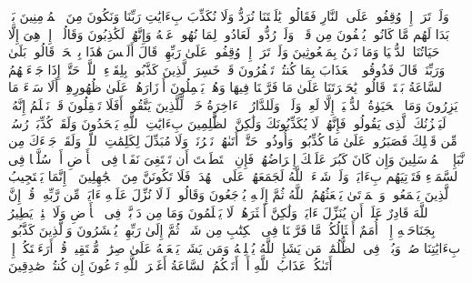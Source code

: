 \stopbuffer
\startbuffer[\q:6:27]
وَلَوۡ تَرَىٰۤ إِذۡ وُقِفُوا۟ عَلَى ٱلنَّارِ فَقَالُوا۟ یَٰلَیۡتَنَا نُرَدُّ وَلَا نُكَذِّبَ بِءَایَٰتِ رَبِّنَا وَنَكُونَ مِنَ ٱلۡمُؤۡمِنِینَ%
\stopbuffer
\startbuffer[\q:6:28]
بَلۡ بَدَا لَهُم مَّا كَانُوا۟ یُخۡفُونَ مِن قَبۡلُۖ وَلَوۡ رُدُّوا۟ لَعَادُوا۟ لِمَا نُهُوا۟ عَنۡهُ وَإِنَّهُمۡ لَكَٰذِبُونَ%
\stopbuffer
\startbuffer[\q:6:29]
وَقَالُوۤا۟ إِنۡ هِیَ إِلَّا حَیَاتُنَا ٱلدُّنۡیَا وَمَا نَحۡنُ بِمَبۡعُوثِینَ%
\stopbuffer
\startbuffer[\q:6:30]
وَلَوۡ تَرَىٰۤ إِذۡ وُقِفُوا۟ عَلَىٰ رَبِّهِمۡۚ قَالَ أَلَیۡسَ هَٰذَا بِٱلۡحَقِّۚ قَالُوا۟ بَلَىٰ وَرَبِّنَاۚ قَالَ فَذُوقُوا۟ ٱلۡعَذَابَ بِمَا كُنتُمۡ تَكۡفُرُونَ%
\stopbuffer
\startbuffer[\q:6:31]
قَدۡ خَسِرَ ٱلَّذِینَ كَذَّبُوا۟ بِلِقَاۤءِ ٱللَّهِۖ حَتَّىٰۤ إِذَا جَاۤءَتۡهُمُ ٱلسَّاعَةُ بَغۡتَةࣰ قَالُوا۟ یَٰحَسۡرَتَنَا عَلَىٰ مَا فَرَّطۡنَا فِیهَا وَهُمۡ یَحۡمِلُونَ أَوۡزَارَهُمۡ عَلَىٰ ظُهُورِهِمۡۚ أَلَا سَاۤءَ مَا یَزِرُونَ%
\stopbuffer
\startbuffer[\q:6:32]
وَمَا ٱلۡحَیَوٰةُ ٱلدُّنۡیَاۤ إِلَّا لَعِبࣱ وَلَهۡوࣱۖ وَلَلدَّارُ ٱلۡءَاخِرَةُ خَیۡرࣱ لِّلَّذِینَ یَتَّقُونَۚ أَفَلَا تَعۡقِلُونَ%
\stopbuffer
\startbuffer[\q:6:33]
قَدۡ نَعۡلَمُ إِنَّهُۥ لَیَحۡزُنُكَ ٱلَّذِی یَقُولُونَۖ فَإِنَّهُمۡ لَا یُكَذِّبُونَكَ وَلَٰكِنَّ ٱلظَّٰلِمِینَ بِءَایَٰتِ ٱللَّهِ یَجۡحَدُونَ%
\stopbuffer
\startbuffer[\q:6:34]
وَلَقَدۡ كُذِّبَتۡ رُسُلࣱ مِّن قَبۡلِكَ فَصَبَرُوا۟ عَلَىٰ مَا كُذِّبُوا۟ وَأُوذُوا۟ حَتَّىٰۤ أَتَىٰهُمۡ نَصۡرُنَاۚ وَلَا مُبَدِّلَ لِكَلِمَٰتِ ٱللَّهِۚ وَلَقَدۡ جَاۤءَكَ مِن نَّبَإِی۟ ٱلۡمُرۡسَلِینَ%
\stopbuffer
\startbuffer[\q:6:35]
وَإِن كَانَ كَبُرَ عَلَیۡكَ إِعۡرَاضُهُمۡ فَإِنِ ٱسۡتَطَعۡتَ أَن تَبۡتَغِیَ نَفَقࣰا فِی ٱلۡأَرۡضِ أَوۡ سُلَّمࣰا فِی ٱلسَّمَاۤءِ فَتَأۡتِیَهُم بِءَایَةࣲۚ وَلَوۡ شَاۤءَ ٱللَّهُ لَجَمَعَهُمۡ عَلَى ٱلۡهُدَىٰۚ فَلَا تَكُونَنَّ مِنَ ٱلۡجَٰهِلِینَ%
\stopbuffer
\startbuffer[\q:6:36]
۞ إِنَّمَا یَسۡتَجِیبُ ٱلَّذِینَ یَسۡمَعُونَۘ وَٱلۡمَوۡتَىٰ یَبۡعَثُهُمُ ٱللَّهُ ثُمَّ إِلَیۡهِ یُرۡجَعُونَ%
\stopbuffer
\startbuffer[\q:6:37]
وَقَالُوا۟ لَوۡلَا نُزِّلَ عَلَیۡهِ ءَایَةࣱ مِّن رَّبِّهِۦۚ قُلۡ إِنَّ ٱللَّهَ قَادِرٌ عَلَىٰۤ أَن یُنَزِّلَ ءَایَةࣰ وَلَٰكِنَّ أَكۡثَرَهُمۡ لَا یَعۡلَمُونَ%
\stopbuffer
\startbuffer[\q:6:38]
وَمَا مِن دَاۤبَّةࣲ فِی ٱلۡأَرۡضِ وَلَا طَٰۤئِرࣲ یَطِیرُ بِجَنَاحَیۡهِ إِلَّاۤ أُمَمٌ أَمۡثَالُكُمۚ مَّا فَرَّطۡنَا فِی ٱلۡكِتَٰبِ مِن شَیۡءࣲۚ ثُمَّ إِلَىٰ رَبِّهِمۡ یُحۡشَرُونَ%
\stopbuffer
\startbuffer[\q:6:39]
وَٱلَّذِینَ كَذَّبُوا۟ بِءَایَٰتِنَا صُمࣱّ وَبُكۡمࣱ فِی ٱلظُّلُمَٰتِۗ مَن یَشَإِ ٱللَّهُ یُضۡلِلۡهُ وَمَن یَشَأۡ یَجۡعَلۡهُ عَلَىٰ صِرَٰطࣲ مُّسۡتَقِیمࣲ%
\stopbuffer
\startbuffer[\q:6:40]
قُلۡ أَرَءَیۡتَكُمۡ إِنۡ أَتَىٰكُمۡ عَذَابُ ٱللَّهِ أَوۡ أَتَتۡكُمُ ٱلسَّاعَةُ أَغَیۡرَ ٱللَّهِ تَدۡعُونَ إِن كُنتُمۡ صَٰدِقِینَ%
